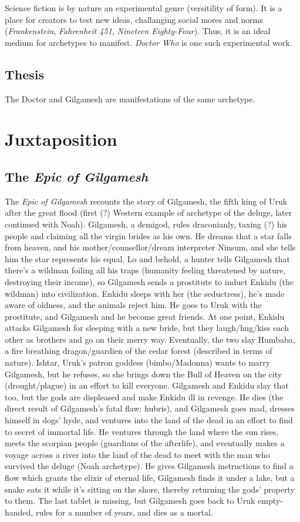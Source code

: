 \documentclass[10pt,a4paper]{article}
\begin{document}
   Science fiction is by nature an experimental genre (versitility of form). It is a place for creators to test new ideas, challanging social mores and norms (\emph{Frankenstein}, \emph{Fahrenheit 451}, \emph{Nineteen Eighty-Four}). Thus, it is an ideal medium for archetypes to manifest. \emph{Doctor Who} is one such experimental work.

\subsection{Thesis}
The Doctor and Gilgamesh are manifestations of the same archetype.
   
\section{Juxtaposition}
\subsection{The \emph{Epic of Gilgamesh}}
The \emph{Epic of Gilgamesh} recounts the story of Gilgamesh, the fifth king of Uruk after the great flood (first (?) Western example of archetype of the deluge, later continued with Noah). Gilgamesh, a demigod, rules draconianly, taxing (?) his people and claiming all the virgin brides as his own. He dreams that a star falls from heaven, and his mother/counsellor/dream interpreter Ninsum, and she tells him the star represents his equal. Lo and behold, a hunter tells Gilgamesh that there's a wildman foiling all his traps (humanity feeling threatened by nature, destroying their income), so Gilgamesh sends a prostitute to induct Enkidu (the wildman) into civilization. Enkidu sleeps with her (the seductress), he's made aware of oldness, and the animals reject him. He goes to Uruk with the prostitute, and Gilgamesh and he become great friends. At one point, Enkidu attacks Gilgamesh for sleeping with a new bride, but they laugh/hug/kiss each other as brothers and go on their merry way. Eventually, the two slay Humbaba, a fire breathing dragon/guardien of the cedar forest (described in terms of nature). Ishtar, Uruk's patron goddess (bimbo/Madonna) wants to marry Gilgamesh, but he refuses, so she brings down the Bull of Heaven on the city (drought/plague) in an effort to kill everyone. Gilgamesh and Enkidu slay that too, but the gods are displeased and make Enkidu ill in revenge. He dies (the direct result of Gilgamesh's fatal flaw: hubris), and Gilgamesh goes mad, dresses himself in dogs' hyde, and ventures into the land of the dead in an effort to find to secret of immortal life. He ventures through the land where the sun rises, meets the scorpian people (guardians of the afterlife), and eventually makes a voyage across a river into the land of the dead to meet with the man who survived the deluge (Noah archetype). He gives Gilgamesh instructions to find a flow which grants the elixir of eternal life, Gilgamesh finds it under a lake, but a snake eats it while it's sitting on the shore, thereby returning the gods' property to them. The last tablet is missing, but Gilgamesh goes back to Uruk empty-handed, rules for a number of years, and dies as a mortal.
\end{document}
